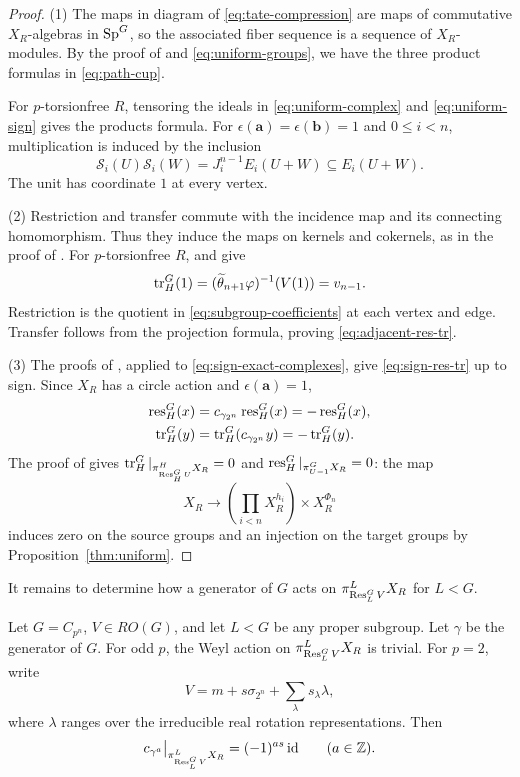 \begin{proof}
\textup{(1)} The maps in diagram of \eqref{eq:tate-compression}
are maps of commutative $X_R$-algebras in $\operatorname{Sp}^G$, so the
associated fiber sequence is a sequence of $X_R$-modules.
By the proof of \cite[Theorem~4.30, equations~(4.31)--(4.32)]{ZhangHZ} and \eqref{eq:uniform-groups}, we have the three product
formulas in \eqref{eq:path-cup}.

For $p$-torsionfree $R$, tensoring the ideals in
\eqref{eq:uniform-complex} and \eqref{eq:uniform-sign}
gives the products formula.
For $\epsilon(\mathbf a)=\epsilon(\mathbf b)=1$ and $0\le i<n$,
multiplication is induced by the inclusion
\[
\mathcal S_i(U)\mathcal S_i(W)
=J_i^{n-1}E_i(U+W)\subseteq E_i(U+W).
\]
The unit has coordinate $1$ at every vertex.

\textup{(2)} Restriction and transfer commute with the incidence map
and its connecting homomorphism. Thus they induce the maps on
kernels and cokernels, as in the proof of
\cite[Theorem~6.13]{ZhangHZ}.
For $p$-torsionfree $R$,
\cite[Proposition~6.2 and Remark~6.6]{BMS} and
\cite[Theorem~3.3]{HM97} give
\[
\operatorname{tr}_H^G(1)
=(\widetilde\theta_{n+1}\varphi)^{-1}(V(1))
=v_{n-1}.
\]
Restriction is the quotient in \eqref{eq:subgroup-coefficients} at each vertex and edge.
Transfer follows from the projection formula, proving \eqref{eq:adjacent-res-tr}.

\textup{(3)} The proofs of
\cite[Propositions~6.17--6.18]{ZhangHZ}, applied to
\eqref{eq:sign-exact-complexes}, give
\eqref{eq:sign-res-tr} up to sign.
Since $X_R$ has a circle action and $\epsilon(\mathbf a)=1$,
\[
\begin{aligned}
\operatorname{res}_H^G(x)
 &=c_{\gamma_{2^n}}\operatorname{res}_H^G(x)=-\operatorname{res}_H^G(x),\\
\operatorname{tr}_H^G(y)
 &=\operatorname{tr}_H^G(c_{\gamma_{2^n}}y)=-\operatorname{tr}_H^G(y).
\end{aligned}
\]
The proof of \cite[Proposition~6.20]{ZhangHZ} gives
$\operatorname{tr}_H^G|_{\pi_{\operatorname{Res}_H^G U}^H X_R}=0$ and
$\operatorname{res}_H^G|_{\pi_{U-1}^G X_R}=0$:
the map
\[
X_R\longrightarrow
\left(\prod_{i<n}X_R^{h_i}\right)\times X_R^{\Phi_n}
\]
induces zero on the source groups and an injection on the target groups
by Proposition~\ref{thm:uniform}.
\end{proof}

It remains to determine how a generator of $G$ acts on
$\pi_{\operatorname{Res}_L^G V}^L X_R$ for $L<G$.

\begin{proposition}
\label{prop:weyl-action}
Let $G=C_{p^n}$, $V\in RO(G)$, and let $L<G$ be any proper
subgroup. Let $\gamma$ be the generator of $G$.
For odd $p$, the Weyl action on
$\pi_{\operatorname{Res}_L^G V}^L X_R$ is trivial.
For $p=2$, write
\[
V=m+s\sigma_{2^n}+\sum_\lambda s_\lambda\lambda,
\]
where $\lambda$ ranges over the irreducible real rotation
representations. Then
\[
c_{\gamma^a}\big|_{\pi_{\operatorname{Res}_L^G V}^L X_R}
=(-1)^{as}\operatorname{id}
\qquad(a\in\mathbb Z).
\]
\end{proposition}

